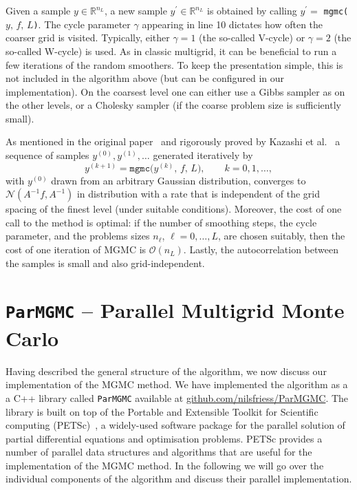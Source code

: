 \documentclass[
fontsize=11pt,
paper=a4,
numbers=noenddot
]{scrartcl}
\begin{document}
Given a sample $y \in \mathbb{R}^{n_L}$, a new sample $y^\prime \in \mathbb{R}^{n_L}$ is obtained by calling $y^\prime =$ \texttt{mgmc(}$y,\, f,\, L$\texttt{)}. The cycle parameter $\gamma$ appearing in line 10 dictates how often the coarser grid is visited. Typically, either $\gamma = 1$ (the so-called V-cycle) or $\gamma = 2$ (the so-called W-cycle) is used. As in classic multigrid, it can be beneficial to run a few iterations of the random smoothers. To keep the presentation simple, this is not included in the algorithm above (but can be configured in our implementation). On the coarsest level one can either use a Gibbs sampler as on the other levels, or a Cholesky sampler (if the coarse problem size is sufficiently small).

As mentioned in the original paper~\cite{goodmansokal} and rigorously proved by Kazashi et al.~\cite{kazashimuellerscheichl} a sequence of samples $y^{(0)}, y^{(1)}, \dotsc$ generated iteratively by 
\begin{equation*}
    y^{(k+1)} = \texttt{mgmc(}y^{(k)},\, f,\, L\texttt{)},\qquad k = 0,1,\dotsc,
\end{equation*}
with $y^{(0)}$ drawn from an arbitrary Gaussian distribution, converges to $\mathcal{N}(A^{-1}f, A^{-1})$ in distribution with a rate that is independent of the grid spacing of the finest level (under suitable conditions). Moreover, the cost of one call to the method is optimal: if the number of smoothing steps, the cycle parameter, and the problems sizes $n_\ell$, $\ell = 0,\dotsc,L$, are chosen suitably, then the cost of one iteration of MGMC is $\mathcal{O}(n_L)$. Lastly, the autocorrelation between the samples is small and also grid-independent.

\section{\texttt{ParMGMC} -- Parallel Multigrid Monte Carlo}
Having described the general structure of the algorithm, we now discuss our implementation of the MGMC method. We have implemented the algorithm as a a C++ library called \texttt{ParMGMC} available at \url{github.com/nilsfriess/ParMGMC}.
The library is built on top of the Portable and Extensible Toolkit for Scientific computing (PETSc)~\cite{petsc-web-page,petsc-user-ref}, a widely-used software package for the parallel solution of partial differential equations and optimisation problems. PETSc provides a number of parallel data structures and algorithms that are useful for the implementation of the MGMC method. In the following we will go over the individual components of the algorithm and discuss their parallel implementation.
\end{document}
